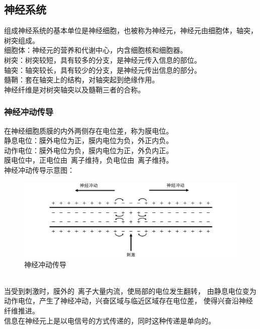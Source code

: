 \documentclass[UTF8]{ctexart}
\begin{document}
\subsection{神经系统}
    组成神经系统的基本单位是神经细胞，也被称为神经元，神经元由细胞体，轴突，树突组成。\\[3mm]
    细胞体：神经元的营养和代谢中心，内含细胞核和细胞器。\\[3mm]
    树突：树突较短，具有较多的分支，是神经元传入信息的部位。\\[3mm]
    轴突：轴突较长，具有较少的分支，是神经元传出信息的部分。\\[3mm]
    髓鞘：套在轴突上的结构，对轴突起到绝缘作用。\\[3mm]
    神经纤维是对树突轴突以及髓鞘三者的合称。

\subsubsection{神经冲动传导}
    在神经细胞质膜的内外两侧存在电位差，称为膜电位。\\[3mm]
    静息电位：膜外电位为正，膜内电位为负，外正内负。\\[3mm]
    动作电位：膜外电位为负，膜内电位为正，外负内正。\\[3mm]
    膜电位中，正电位由~离子维持，负电位由~离子维持。\\[3mm]
    神经冲动传导示意图：\vspace{-5pt}
    \begin{figure}[h]
        \begin{center}
            \includegraphics[width=12cm]{BiologyImage/14.jpg}
            \caption{神经冲动传导}
        \end{center}
    \end{figure}\\
    当受到刺激时，膜外的~离子大量内流，使局部的电位发生翻转，
    由静息电位变为动作电位，产生了神经冲动，兴奋区域与临近区域存在电位差，
    使得兴奋沿神经纤维推进。\\[2mm]
    信息在神经元上是以电信号的方式传递的，同时这种传递是单向的。
    
\end{document}
